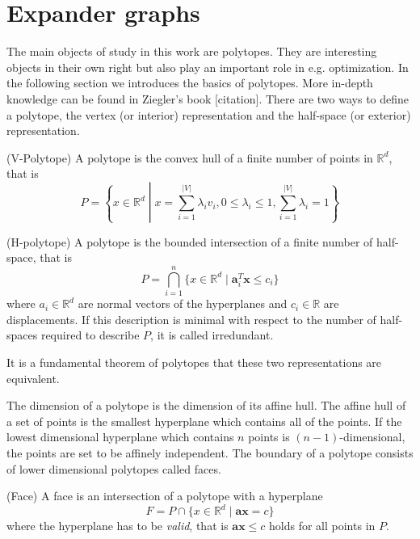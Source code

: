 \chapter{Expander graphs}
\label{mathchapter}


The main objects of study in this work are polytopes. They are interesting 
objects in their own right but also play an important role in e.g. 
optimization. In the following section we introduces the basics of polytopes. 
More in-depth knowledge can be found in Ziegler's book [citation]. There are 
two ways to define a polytope, the vertex (or interior) representation and the 
half-space (or exterior) representation.

\begin{definition}
(V-Polytope) A polytope is the convex hull of a finite number of points in 
$\mathbb{R}^d$, that is 
\begin{equation}
 P = \left\{x\in \mathbb{R}^d \middle| x = \sum_{i=1}^{|V|} \lambda_i v_i, 
0\leq \lambda_i \leq 1, \sum_{i=1}^{|V|} \lambda_i = 1 \right\}
\end{equation}

\end{definition}

\begin{definition}
 (H-polytope) A polytope is the bounded intersection of a finite number of 
half-space, that is
\begin{equation}
 P = \bigcap_{i=1}^n \{x \in \mathbb{R}^d \mid \mathbf{a}_i^T \mathbf{x} \leq 
c_i \}
\end{equation}
where $a_i \in \mathbb{R}^d$ are normal vectors of the hyperplanes and $c_i \in 
\mathbb{R}$ are displacements. If this description is minimal with respect to 
the number of half-spaces required to describe $P$, it is called irredundant.
\end{definition}

It is a fundamental theorem of polytopes that these two representations are 
equivalent.

The dimension of a polytope is the dimension of its affine hull. The affine 
hull of a set of points is the smallest hyperplane which contains all of the 
points. If the lowest dimensional hyperplane which contains $n$ points is 
$(n-1)$-dimensional, the points are set to be affinely independent. The 
boundary 
of a polytope consists of lower dimensional polytopes called faces. 
\begin{definition}
 (Face) A face is an intersection of a polytope with a hyperplane 
\begin{equation}
 F = P \cap \{x \in \mathbb{R}^d \mid \mathbf{a}\mathbf{x} = c\}
\end{equation}
where the hyperplane has to be \textit{valid}, that is $\mathbf{a}\mathbf{x} 
\leq c$ holds for all points in $P$. 

\end{definition}


